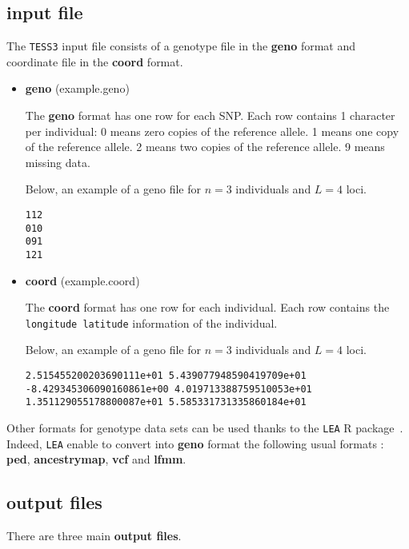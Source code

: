 \documentclass[10pt,a4paper]{article}
\begin{document}
\subsection{input file}
The {\tt TESS3} input file consists of a genotype file in the {\bf geno} format and coordinate file in the {\bf coord} format. 
\begin{itemize}
\item {\bf geno} (example.geno)

The {\bf geno} format has one row for each SNP.
  Each row contains 1 character per individual:
  0 means zero copies of the reference allele.
  1 means one copy of the reference allele.
  2 means two copies of the reference allele.
  9 means missing data.

Below, an example of a geno file for $n=3$ individuals and $L=4$ loci.
\begin{center}
\footnotesize
\begin{Verbatim}[frame=single]
112
010
091
121
\end{Verbatim}
\end{center}


\item {\bf coord} (example.coord)

The {\bf coord} format has one row for each individual. Each row contains the \verb|longitude latitude| information of the individual.

Below, an example of a geno file for $n=3$ individuals and $L=4$ loci.
\begin{center}
\footnotesize
\begin{Verbatim}[frame=single]
2.515455200203690111e+01 5.439077948590419709e+01
-8.429345306090160861e+00 4.019713388759510053e+01
1.351129055178800087e+01 5.585331731335860184e+01
\end{Verbatim}
\end{center}

\end{itemize}

\noindent
Other formats for genotype data sets can be used thanks to the {\tt LEA} R package~\cite{frichot2015lea}. Indeed, {\tt LEA} enable to convert into {\bf geno} format the following usual formats : {\bf ped}, {\bf ancestrymap}, {\bf vcf} and {\bf lfmm}.

\subsection{output files}
\noindent
There are three main {\bf output files}.
\end{document}
